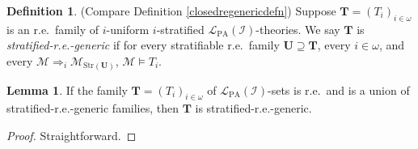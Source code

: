 \documentclass[reqno]{article}
\theoremstyle{definition}
\newtheorem{lemma}[theorem]{Lemma}
\newtheorem{definition}[theorem]{Definition}
\def\L{\mathscr{L}}
\def\M{\mathscr{M}}
\def\T{\mathbf{T}}
\def\U{\mathbf{U}}
\def\LPA{\L_{\mathrm{PA}}}
\def\indset{\mathcal I}
\def\myequiv{\Rightarrow}
\newcommand{\str}[1]{\mathrm{Str}(#1)} \newcommand{\Str}[1]{\str{#1}}
\begin{document}
\begin{definition}
\label{bootstrapclosedrestrat}
(Compare Definition \ref{closedregenericdefn})
Suppose $\T=(T_i)_{i\in\omega}$
is an r.e.~family of $i$-uniform $i$-stratified $\LPA(\indset)$-theories.
%
%
We say $\T$ is \emph{stratified-r.e.-generic} if
for every stratifiable r.e.~family $\U\supseteq\T$, every $i\in\omega$, and every $\M\myequiv_i\M_{\str\U}$, $\M\models T_i$.
\end{definition}

%
%

\begin{lemma}
If the family $\T=(T_i)_{i\in\omega}$ of $\LPA(\indset)$-sets is r.e.~and is a union
of stratified-r.e.-generic families, then $\T$ is stratified-r.e.-generic.
\end{lemma}

\begin{proof}
Straightforward.
\end{proof}
\end{document}
